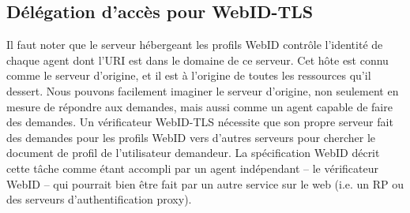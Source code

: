 \subsection*{Délégation d'accès pour WebID-TLS}
Il faut noter que le serveur hébergeant les profils WebID contrôle l'identité de chaque agent dont l'URI est dans le domaine de ce serveur. Cet hôte est connu comme le serveur d'origine, et il est à l'origine de toutes les ressources qu'il dessert. Nous pouvons facilement imaginer le serveur d'origine, non seulement en mesure de répondre aux demandes, mais aussi comme un agent capable de faire des demandes. Un vérificateur WebID-TLS nécessite que son propre serveur fait des demandes pour les profils WebID vers d'autres serveurs pour chercher le document de profil de l'utilisateur demandeur. La spécification WebID décrit cette tâche comme étant accompli par un agent indépendant -- le vérificateur WebID -- qui pourrait bien être fait par un autre service sur le web (i.e. un RP ou des serveurs d'authentification proxy).\\


